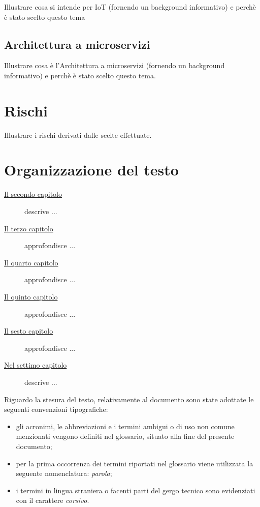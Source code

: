 Illustrare cosa si intende per IoT (fornendo un background informativo) e perchè è stato scelto questo tema

\subsection{Architettura a microservizi}

Illustrare cosa è l'Architettura a microservizi (fornendo un background informativo) e perchè è stato scelto questo tema.

\section{Rischi}

Illustrare i rischi derivati dalle scelte effettuate.

\section{Organizzazione del testo}

\begin{description}
    \item[{\hyperref[cap:processi-metodologie]{Il secondo capitolo}}] descrive ...

    \item[{\hyperref[cap:descrizione-stage]{Il terzo capitolo}}] approfondisce ...

    \item[{\hyperref[cap:analisi-requisiti]{Il quarto capitolo}}] approfondisce ...

    \item[{\hyperref[cap:progettazione-codifica]{Il quinto capitolo}}] approfondisce ...

    \item[{\hyperref[cap:verifica-validazione]{Il sesto capitolo}}] approfondisce ...

    \item[{\hyperref[cap:conclusioni]{Nel settimo capitolo}}] descrive ...
\end{description}

Riguardo la stesura del testo, relativamente al documento sono state adottate le seguenti convenzioni tipografiche:
\begin{itemize}
	\item gli acronimi, le abbreviazioni e i termini ambigui o di uso non comune menzionati vengono definiti nel glossario, situato alla fine del presente documento;
	\item per la prima occorrenza dei termini riportati nel glossario viene utilizzata la seguente nomenclatura: \emph{parola}\glsfirstoccur;
	\item i termini in lingua straniera o facenti parti del gergo tecnico sono evidenziati con il carattere \emph{corsivo}.
\end{itemize}
